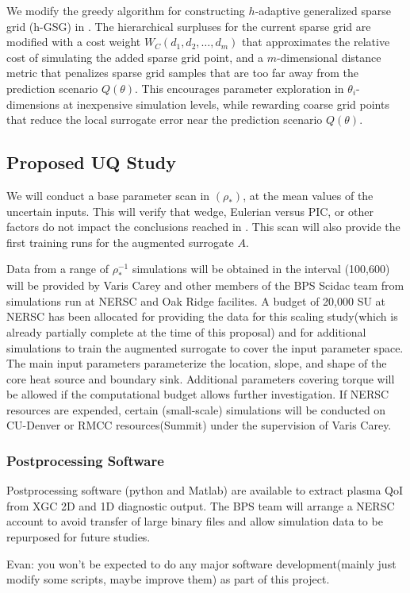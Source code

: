 We modify the 
greedy algorithm for constructing $h$-adaptive generalized sparse grid (h-GSG) in \cite{Jakeman2011LocalAD}.
The hierarchical surpluses for the current sparse grid are modified with a cost weight $W_C(d_1,d_2,\ldots,d_m)$ that approximates the relative
cost of simulating the added sparse grid point, and a $m$-dimensional distance metric that penalizes sparse grid
samples that are too far away from the prediction scenario $Q(\theta)$.  This encourages parameter exploration in $\theta_i$-dimensions at
inexpensive simulation levels, while rewarding coarse grid points that reduce the local surrogate error near the prediction scenario $Q(\theta)$.  

\subsection{Proposed UQ Study}
We will conduct a base parameter scan in $(\rho_*)$, at the mean values of the uncertain inputs.  This will verify that wedge, Eulerian versus PIC, or other factors do not impact the conclusions reached in \cite{Yas_Ido}.  This scan will also provide the first training runs for
the augmented surrogate $A$.  

Data from a range of $\rho^{-1}_*$ simulations will be obtained in the interval (100,600) will be provided by Varis Carey and other members
of the BPS Scidac team  from simulations run at NERSC and Oak Ridge facilites.  A budget of 20,000 SU at NERSC has been allocated for providing the data for this scaling study(which is already partially complete at the time of this proposal)
 and for additional simulations to train the augmented surrogate to cover the input parameter space.
The main input parameters parameterize the location, slope, and shape of the core heat source and boundary sink.  Additional parameters covering
torque will be allowed if the computational budget allows further investigation.  If NERSC resources are expended, certain (small-scale)
simulations will be conducted on CU-Denver or RMCC resources(Summit) under the supervision of Varis Carey.

\subsubsection*{Postprocessing Software}
Postprocessing software (python and Matlab) are available to extract plasma QoI from  XGC 2D and 1D diagnostic output.  The BPS team will
arrange a NERSC account to avoid transfer of large binary files and allow simulation data to be repurposed for future studies. 

Evan: you won't be expected to do any major software development(mainly just modify some scripts, maybe improve them) as part of this project.

 


 
